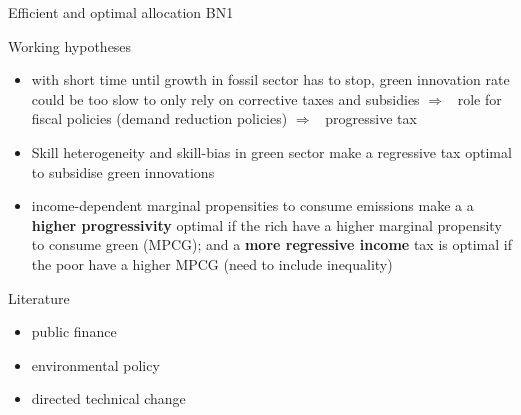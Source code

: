 \documentclass[11pt,aspectratio=169]{beamer}
\newcommand{\ar}{$\Rightarrow$ \ }
\begin{document}
\begin{frame}{Efficient and optimal allocation BN1}
\begin{minipage}[]{0.32\textwidth}
	\end{minipage}
\end{frame}

\appendix
\begin{frame}{Working hypotheses}	
	\begin{itemize}
		\item<+-> with short time until growth in fossil sector has to stop, green innovation rate could be too slow to only rely on corrective taxes and subsidies \ar role for fiscal policies (demand reduction policies) \ar progressive tax
		\vspace{3mm}
		\item<+-> Skill heterogeneity and skill-bias in green sector make a regressive tax optimal to subsidise green innovations
		\vspace{3mm}
		\item<+-> income-dependent marginal propensities to consume emissions make a a \textbf{higher progressivity} optimal if the rich have a higher marginal propensity to consume green (MPCG); and a \textbf{more regressive income} tax is optimal if the poor have a higher MPCG (need to include inequality) 
	\end{itemize}
\end{frame}



\begin{frame}{Literature}
	\begin{itemize}
		\item public finance
		\item environmental policy
		\item directed technical change
	\end{itemize}
\end{frame}
\end{document}

